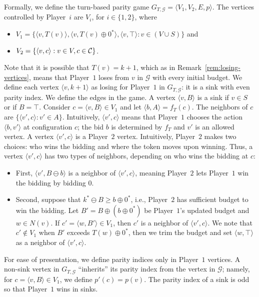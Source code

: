 \documentclass{article}\providecommand{\nequiv}{\not\equiv}\usepackage[a4paper,margin=20mm]{geometry}
\newcommand{\PO}{Player~$1$\xspace}
\newcommand{\PT}{Player~$2$\xspace}
\newcommand{\PLi}{Player~$i$\xspace}
\newcommand{\C}{{\cal C}}
\newcommand{\G}{{\mathcal G}}
\newcommand{\zug}[1]{\langle #1  \rangle}
\renewcommand{\set}[1]{\{ #1  \}}
\newcommand{\succb}[1]{#1 \oplus 0^*\xspace}
\begin{document}
Formally, we define the turn-based parity game $G_{T, \G} = \zug{V_1, V_2, E, p}$. The vertices controlled by \PLi are $V_i$, for $i \in \set{1,2}$, where
	\begin{itemize}
		\item $V_1 = \{\zug{v,T(v)}, \zug{v, \succb{T(v)}}, \zug{v, \top}: v \in (V \cup S)\}$ and 
		\item $V_2 = \set{\zug{v, c}: v \in V, c \in \C}$.
	\end{itemize}
    Note that it is possible that $T(v) = k+1$, which as in  Remark~\ref{rem:losing-vertices}, means that \PO loses from $v$ in $\G$ with every initial budget. 
    We define each vertex $\zug{v, k+1}$ as losing for \PO in $G_{T, \G}$: it is a sink with even parity index. 
	We define the edges in the game. A vertex $\zug{v, B}$ is a sink if $v \in S$ or if $B = \top$. Consider $c = \zug{v, B} \in V_1$ and let $\zug{b, A} = f_T(c)$. The neighbors of $c$ are $\set{\zug{v', c}: v' \in A}$. Intuitively, $\zug{v', c}$ means that \PO chooses the action $\zug{b,v'}$ at configuration $c$; the bid $b$ is determined by $f_T$ and $v'$ is an allowed vertex. A vertex $\zug{v', c}$ is a \PT vertex. Intuitively, \PT makes two choices: who wins the bidding and where the token moves upon winning. Thus, a vertex $\zug{v', c}$ has two types of neighbors, depending on who wins the bidding at $c$:
	\begin{itemize}
		\item First, $\zug{v', B \ominus b}$ is a neighbor of $\zug{v', c}$, meaning \PT lets \PO win the bidding by bidding $0$.
		\item Second, suppose that $k^* \ominus B \geq \succb{b}$, i.e., \PT has sufficient budget to win the bidding. Let $B' = B \oplus (\succb{b})$ be \PO's updated budget and $w \in N(v)$. If $c' = \zug{w, B'} \in V_1$, then $c'$ is a neighbor of $\zug{v', c}$. We note that $c' \notin V_1$ when $B'$ exceeds $\succb{T(w)}$, then we trim the budget and set  $\zug{w, \top}$ as a neighbor of $\zug{v', c}$.
	\end{itemize}
	For ease of presentation, we define parity indices only in \PO vertices. 
	A non-sink vertex in $G_{T, \G}$ ``inherits'' its parity index from the vertex in $\G$; namely, for \(c = \zug{v,B} \in V_1\), we define $p'(c) = p(v)$.  The parity index of a sink is odd so that \PO wins in sinks. 
\end{document}
